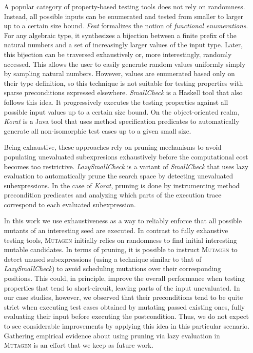 \documentclass[sigconf, anonymous]{acmart}
\newcommand{\mutagen}{\textsc{Mutagen}\xspace}
\begin{document}
A popular category of property-based testing tools does not rely on randomness.
%
Instead, all possible inputs can be enumerated and tested from smaller to larger
up to a certain size bound.
%
%
%
\emph{Feat} \cite{DuregardJW12} formalizes the notion of \emph{functional
  enumerations}.
%
For any algebraic type, it synthesizes a bijection between a finite prefix of
the natural numbers and a set of increasingly larger values of the input type.
%
Later, this bijection can be traversed exhaustively or, more interestingly,
randomly accessed.
%
This allows the user to easily generate random values uniformly simply by
sampling natural numbers.
%
However, values are enumerated based only on their type definition, so this
technique is not suitable for testing properties with sparse preconditions
expressed elsewhere.
%
\emph{SmallCheck} \cite{runciman2008smallcheck} is a Haskell tool that also
follows this idea.
%
It progressively executes the testing properties against all possible input
values up to a certain size bound.
%
On the object-oriented realm, \emph{Korat} \cite{boyapati2002korat} is a Java
tool that uses method specification predicates to automatically generate all
non-isomorphic test cases up to a given small size.


Being exhaustive, these approaches rely on pruning mechanisms to avoid
populating unevaluated subexpresions exhaustively before the computational cost
becomes too restrictive.
%
\emph{LazySmallCheck} is a variant of \emph{SmallCheck} that uses lazy
evaluation to automatically prune the search space by detecting unevaluated
subexpressions.
%
In the case of \emph{Korat}, pruning is done by instrumenting method
precondition predicates and analyzing which parts of the execution trace
correspond to each evaluated subexpression.


In this work we use exhaustiveness as a way to reliably enforce that all
possible mutants of an interesting seed are executed.
%
In contrast to fully exhaustive testing tools, \mutagen initially relies on
randomness to find initial interesting mutable candidates.
%
In terms of pruning, it is possible to instruct \mutagen to detect unused
subexpressions (using a technique similar to that of \emph{LazySmallCheck}) to
avoid scheduling mutations over their corresponding positions.
%
This could, in principle, improve the overall performance when testing
properties that tend to short-circuit, leaving parts of the input unevaluated.
%
In our case studies, however, we observed that their preconditions tend to be
quite strict when executing test cases obtained by mutating passed existing
ones, fully evaluating their input before executing the postcondition.
%
Thus, we do not expect to see considerable improvements by applying this idea in
this particular scenario.
%
Gathering empirical evidence about using pruning via lazy evaluation in \mutagen
is an effort that we keep as future work.
\end{document}
